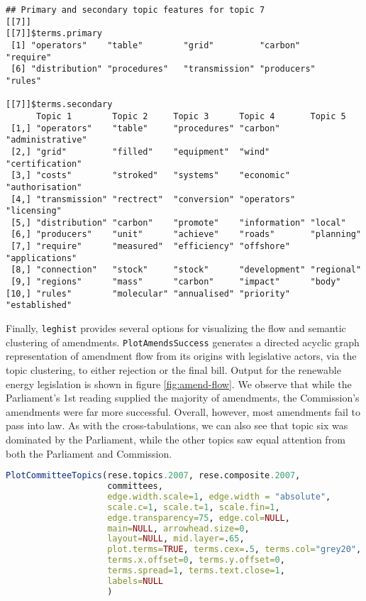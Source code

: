 \documentclass[11pt]{article}
\begin{document}
\begin{verbatim}
## Primary and secondary topic features for topic 7 
[[7]]
[[7]]$terms.primary
 [1] "operators"    "table"        "grid"         "carbon"       "require"     
 [6] "distribution" "procedures"   "transmission" "producers"    "rules"       

[[7]]$terms.secondary
      Topic 1        Topic 2     Topic 3      Topic 4       Topic 5         
 [1,] "operators"    "table"     "procedures" "carbon"      "administrative"
 [2,] "grid"         "filled"    "equipment"  "wind"        "certification" 
 [3,] "costs"        "stroked"   "systems"    "economic"    "authorisation" 
 [4,] "transmission" "rectrect"  "conversion" "operators"   "licensing"     
 [5,] "distribution" "carbon"    "promote"    "information" "local"         
 [6,] "producers"    "unit"      "achieve"    "roads"       "planning"      
 [7,] "require"      "measured"  "efficiency" "offshore"    "applications"  
 [8,] "connection"   "stock"     "stock"      "development" "regional"      
 [9,] "regions"      "mass"      "carbon"     "impact"      "body"          
[10,] "rules"        "molecular" "annualised" "priority"    "established" 
\end{verbatim}


Finally, \texttt{leghist} provides several options for visualizing the
flow and semantic clustering of amendments. \texttt{PlotAmendsSuccess}
generates a directed acyclic graph representation of amendment flow
from its origins with legislative actors, via the topic clustering, to
either rejection or the final bill. Output for the renewable energy
legislation is shown in figure \ref{fig:amend-flow}. We observe that
while the Parliament's 1st reading supplied the majority of
amendments, the Commission's amendments were far more
successful. Overall, however, most amendments fail to pass into
law. As with the cross-tabulations, we can also see that topic six was
dominated by the Parliament, while the other topics saw equal
attention from both the Parliament and Commission.


\begin{lstlisting}[language=R, numbers=none]
PlotCommitteeTopics(rese.topics.2007, rese.composite.2007,
                    committees,
                    edge.width.scale=1, edge.width = "absolute",
                    scale.c=1, scale.t=1, scale.fin=1,
                    edge.transparency=75, edge.col=NULL,
                    main=NULL, arrowhead.size=0, 
                    layout=NULL, mid.layer=.65, 
                    plot.terms=TRUE, terms.cex=.5, terms.col="grey20",
                    terms.x.offset=0, terms.y.offset=0, 
                    terms.spread=1, terms.text.close=1,
                    labels=NULL
                    )
\end{lstlisting}
\end{document}
